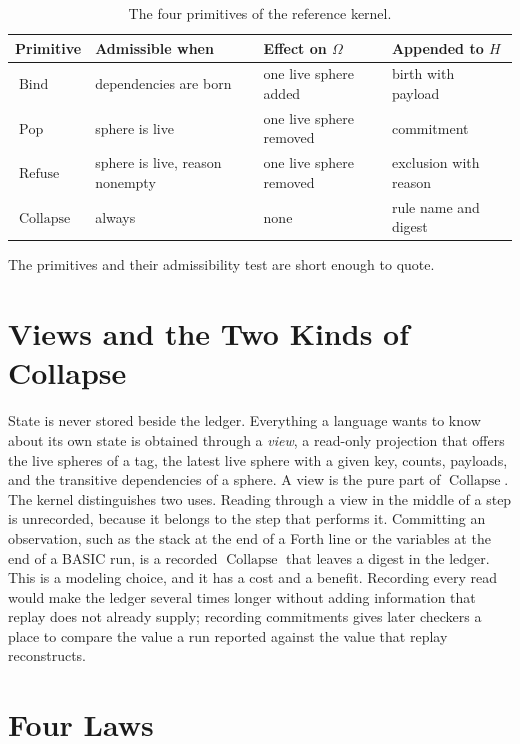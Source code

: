 \documentclass[11pt,oneside]{report}
\newcommand{\Pop}{\operatorname{Pop}}
\newcommand{\Refuse}{\operatorname{Refuse}}
\newcommand{\Bind}{\operatorname{Bind}}
\newcommand{\Collapse}{\operatorname{Collapse}}
\theoremstyle{plain}
\theoremstyle{definition}
\theoremstyle{remark}
\newcommand{\code}[2][Python]{}
\begin{document}
\begin{table}[H]
\centering
\begin{tabular}{llll}
\toprule
Primitive & Admissible when & Effect on $\Omega$ & Appended to $H$\\
\midrule
$\Bind$ & dependencies are born & one live sphere added & birth with payload\\
$\Pop$ & sphere is live & one live sphere removed & commitment\\
$\Refuse$ & sphere is live, reason nonempty & one live sphere removed & exclusion with reason\\
$\Collapse$ & always & none & rule name and digest\\
\bottomrule
\end{tabular}
\caption{The four primitives of the reference kernel.}
\end{table}

The primitives and their admissibility test are short enough to quote.

\code{ex_kernel_prims}
\code{ex_kernel_commit}

\section{Views and the Two Kinds of Collapse}

State is never stored beside the ledger. Everything a language wants to know about its own state is obtained through a \emph{view}, a read-only projection that offers the live spheres of a tag, the latest live sphere with a given key, counts, payloads, and the transitive dependencies of a sphere. A view is the pure part of $\Collapse$. The kernel distinguishes two uses. Reading through a view in the middle of a step is unrecorded, because it belongs to the step that performs it. Committing an observation, such as the stack at the end of a Forth line or the variables at the end of a BASIC run, is a recorded $\Collapse$ that leaves a digest in the ledger. This is a modeling choice, and it has a cost and a benefit. Recording every read would make the ledger several times longer without adding information that replay does not already supply; recording commitments gives later checkers a place to compare the value a run reported against the value that replay reconstructs.

\section{Four Laws}
\end{document}
